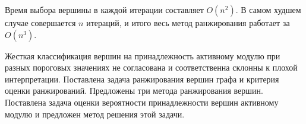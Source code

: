 Время выбора вершины в каждой итерации составляет $O(n^2)$.  В самом худшем
случае совершается $n$ итераций, и итого весь метод ранжирования работает за
$O(n^3)$.

\chapterconclusion
Жесткая классификация вершин на принадлежность активному модулю при разных
пороговых значениях не согласована и соответственна склонны к плохой
интерпретации.  Поставлена задача ранжирования вершин графа и критерия оценки
ранжирований. Предложены три метода ранжирования вершин.  Поставлена задача
оценки вероятности принадлежности вершин активному модулю и предложен метод
решения этой задачи.
